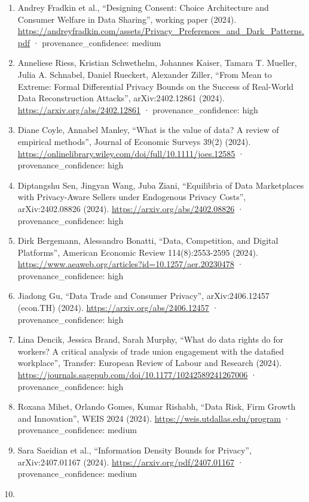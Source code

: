 \documentclass[
  11pt,
]{article}
\begin{document}
\begin{enumerate}
\item
  Andrey Fradkin et al., ``Designing Consent: Choice Architecture and
  Consumer Welfare in Data Sharing'', working paper (2024).
  \url{https://andreyfradkin.com/assets/Privacy_Preferences_and_Dark_Patterns.pdf}
  · provenance\_confidence: medium
\item
  Anneliese Riess, Kristian Schwethelm, Johannes Kaiser, Tamara T.
  Mueller, Julia A. Schnabel, Daniel Rueckert, Alexander Ziller, ``From
  Mean to Extreme: Formal Differential Privacy Bounds on the Success of
  Real-World Data Reconstruction Attacks'', arXiv:2402.12861 (2024).
  \url{https://arxiv.org/abs/2402.12861} · provenance\_confidence: high
\item
  Diane Coyle, Annabel Manley, ``What is the value of data? A review of
  empirical methods'', Journal of Economic Surveys 39(2) (2024).
  \url{https://onlinelibrary.wiley.com/doi/full/10.1111/joes.12585} ·
  provenance\_confidence: high
\item
  Diptangshu Sen, Jingyan Wang, Juba Ziani, ``Equilibria of Data
  Marketplaces with Privacy-Aware Sellers under Endogenous Privacy
  Costs'', arXiv:2402.08826 (2024).
  \url{https://arxiv.org/abs/2402.08826} · provenance\_confidence: high
\item
  Dirk Bergemann, Alessandro Bonatti, ``Data, Competition, and Digital
  Platforms'', American Economic Review 114(8):2553-2595 (2024).
  \url{https://www.aeaweb.org/articles?id=10.1257/aer.20230478} ·
  provenance\_confidence: high
\item
  Jiadong Gu, ``Data Trade and Consumer Privacy'', arXiv:2406.12457
  (econ.TH) (2024). \url{https://arxiv.org/abs/2406.12457} ·
  provenance\_confidence: high
\item
  Lina Dencik, Jessica Brand, Sarah Murphy, ``What do data rights do for
  workers? A critical analysis of trade union engagement with the
  datafied workplace'', Transfer: European Review of Labour and Research
  (2024).
  \url{https://journals.sagepub.com/doi/10.1177/10242589241267006} ·
  provenance\_confidence: high
\item
  Roxana Mihet, Orlando Gomes, Kumar Rishabh, ``Data Risk, Firm Growth
  and Innovation'', WEIS 2024 (2024).
  \url{https://weis.utdallas.edu/program} · provenance\_confidence:
  medium
\item
  Sara Saeidian et al., ``Information Density Bounds for Privacy'',
  arXiv:2407.01167 (2024). \url{https://arxiv.org/pdf/2407.01167} ·
  provenance\_confidence: medium
\item

\end{enumerate}
\end{document}
